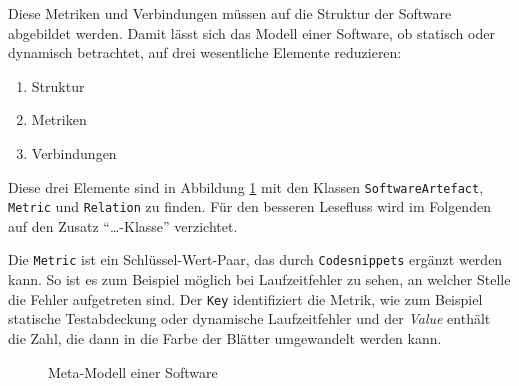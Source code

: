 Diese Metriken und Verbindungen müssen auf die Struktur der Software abgebildet werden. Damit lässt sich das Modell einer Software, ob statisch oder dynamisch betrachtet, auf drei wesentliche Elemente reduzieren:

\begin{enumerate}
  \item Struktur
  \item Metriken
  \item Verbindungen
\end{enumerate}

Diese drei Elemente sind in Abbildung \ref{fig:meta-model} mit den Klassen \texttt{SoftwareArtefact}, \texttt{Metric} und \texttt{Relation} zu finden. Für den besseren Lesefluss wird im Folgenden auf den Zusatz "`\dots-Klasse"' verzichtet.

Die \texttt{Metric} ist ein Schlüssel-Wert-Paar, das durch \texttt{Codesnippets} ergänzt werden kann. So ist es zum Beispiel möglich bei Laufzeitfehler zu sehen, an welcher Stelle die Fehler aufgetreten sind. Der \texttt{Key} identifiziert die Metrik, wie zum Beispiel statische Testabdeckung oder dynamische Laufzeitfehler und der \textit{Value} enthält die Zahl, die dann in die Farbe der Blätter umgewandelt werden kann.


\begin{figure}[htb]
\caption{Meta-Modell einer Software}
\label{fig:meta-model}
\end{figure}

